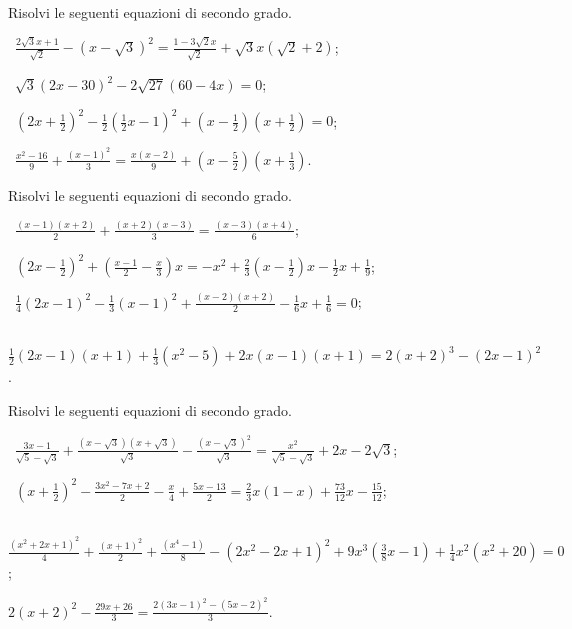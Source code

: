 \begin{esercizio}[\Ast]
 \label{ese:3.26}
Risolvi le seguenti equazioni di secondo grado.
 \begin{enumeratea}
 \item~$\frac{2 \sqrt{3} x + 1}{\sqrt{2}}-\left(x-\sqrt{3} \right)^{2} = \frac{1-3 \sqrt{2} x}{\sqrt{2}} + \sqrt{3} x \left(\sqrt{2}+ 2 \right)$;
 \item~$\sqrt{3} (2 x-30)^{2}-2 \sqrt{27} (60-4 x) = 0$;
 \item~$\left(2 x + \frac{1}{2} \right)^{2}-\frac{1}{2} \left(\frac{1}{2} x-1 \right)^{2} + \left(x-\frac{1}{2} \right) \left(x + \frac{1}{2} \right) = 0$;
 \item~$\frac{x^{2}-16}{9} + \frac{(x-1)^{2}}{3} = \frac{x (x -2)}{9} + \left(x-\frac{5}{2} \right) \left(x + \frac{1}{3}\right)$.
 \end{enumeratea}
\end{esercizio}

 \begin{esercizio}[\Ast]
\label{ese:3.27}
Risolvi le seguenti equazioni di secondo grado.
 \begin{enumeratea}
 \item~$\frac{(x-1) (x + 2)}{2} + \frac{(x + 2) (x-3)}{3} =\frac{(x-3) (x + 4)}{6}$;
 \item~$\left(2 x-\frac{1}{2} \right)^{2} + \left(\frac{x-1}{2} -\frac{x}{3} \right) x =-x^{2} + \frac{2}{3} \left(x-\frac{1}{2}\right) x-\frac{1}{2} x + \frac{1}{9}$;
 \item~$\frac{1}{4} (2 x-1)^{2}-\frac{1}{3} (x-1)^{2} +\frac{(x-2) (x + 2)}{2}-\frac{1}{6} x + \frac{1}{6} = 0$;
 \item~$\frac{1}{2} (2 x-1) (x + 1) + \frac{1}{3} \left(x^{2}-5\right) + 2 x (x-1) (x + 1) = 2 (x + 2)^{3}-(2 x-1)^{2}$.
 \end{enumeratea}
\end{esercizio}

\begin{esercizio}[\Ast]
\label{ese:3.28}
Risolvi le seguenti equazioni di secondo grado.
 \begin{enumeratea}
 \item~$\frac{3 x-1}{\sqrt{5}-\sqrt{3}} + \frac{\left(x-\sqrt{3}\right) \left(x + \sqrt{3} \right)}{\sqrt{3}}-\frac{\left(x -\sqrt{3} \right)^{2}}{\sqrt{3}} = \frac{x^{2}}{\sqrt{5}-\sqrt{3}} + 2 x-2 \sqrt{3}$;
 \item~$\left(x + \frac{1}{2} \right)^{2}-\frac{3 x^{2}-7 x + 2}{2} - \frac{x}{4} + \frac{5 x-13}{2} = \frac{2}{3} x (1-x) +\frac{73}{12} x-\frac{15}{12}$;
 \item~$\frac{(x^{2} + 2 x + 1)^{2}}{4} + \frac{(x + 1)^{2}}{2}+ \frac{(x^{4}-1)}{8}-(2 x^{2}-2 x + 1)^{2} + 9 x^{3}\left(\frac{3}{8} x-1 \right) + \frac{1}{4} x^{2} (x^{2} + 20)= 0$;
  \item $2(x+2)^{2}-\frac{29x+26}{3}=\frac{2(3x-1)^{2}-(5x-2)^{2}}{3}$.
 \end{enumeratea}
\end{esercizio}

